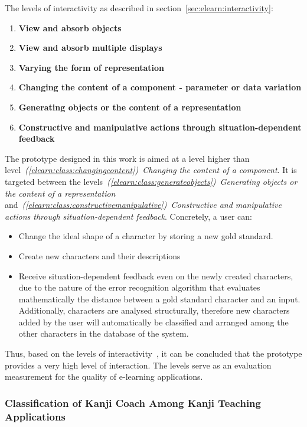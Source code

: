 \noindent The levels of interactivity as described in 
section~\ref{sec:elearn:interactivity}:
\begin{enumerate}
\item \textbf{View and absorb objects} 
\item \textbf{View and absorb multiple displays} 
\item \textbf{Varying the form of representation} 
\item \textbf{Changing the content of a component - parameter or data variation}
\item \textbf{Generating objects or the content of a representation} 
\item \textbf{Constructive and manipulative actions through situation-dependent feedback}
\end{enumerate}
The prototype designed in this work is aimed at a level higher than 
level~\emph{(\ref{elearn:class:changingcontent})~Changing the content of a 
component}. It is targeted between the 
levels~\emph{(\ref{elearn:class:generateobjects})~Generating objects or 
the content of a representation} 
and~\emph{(\ref{elearn:class:constructivemanipulative})~Constructive and 
manipulative actions through situation-dependent feedback}.
Concretely, a user can:
\begin{itemize}
 \item Change the ideal shape of a character by storing a new gold standard.
 \item Create new characters and their descriptions
 \item Receive situation-dependent feedback even on the newly created characters,
       due to the nature of the error recognition algorithm that evaluates
       mathematically the distance between a gold standard character and
       an input.
       Additionally, characters are analysed structurally, therefore new 
       characters added by the user will automatically be classified and arranged
       among the other characters in the database of the system.
\end{itemize}
Thus, based on the levels of interactivity~,
it can be concluded that the prototype provides a very high level of 
interaction. The levels serve as an evaluation measurement for the quality of 
e-learning applications.

\subsubsection[Classification of Kanji Coach]
{Classification of Kanji Coach Among Kanji Teaching Applications}
\label{sec:concept:classificationofkanjicoach}

